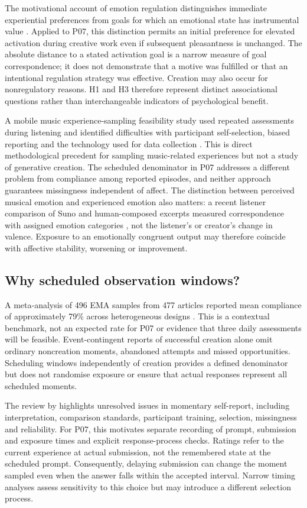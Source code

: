 \documentclass[11pt]{article}
\begin{document}
The motivational account of emotion regulation distinguishes immediate experiential preferences from goals for which an emotional state has instrumental value \citep{tamir2016}. Applied to P07, this distinction permits an initial preference for elevated activation during creative work even if subsequent pleasantness is unchanged. The absolute distance to a stated activation goal is a narrow measure of goal correspondence; it does not demonstrate that a motive was fulfilled or that an intentional regulation strategy was effective. Creation may also occur for nonregulatory reasons. H1 and H3 therefore represent distinct associational questions rather than interchangeable indicators of psychological benefit.

A mobile music experience-sampling feasibility study used repeated assessments during listening and identified difficulties with participant self-selection, biased reporting and the technology used for data collection \citep{mcferran2025}. This is direct methodological precedent for sampling music-related experiences but not a study of generative creation. The scheduled denominator in P07 addresses a different problem from compliance among reported episodes, and neither approach guarantees missingness independent of affect. The distinction between perceived musical emotion and experienced emotion also matters: a recent listener comparison of Suno and human-composed excerpts measured correspondence with assigned emotion categories \citep{qi2026}, not the listener's or creator's change in valence. Exposure to an emotionally congruent output may therefore coincide with affective stability, worsening or improvement.

\subsection{Why scheduled observation windows?}
A meta-analysis of 496 EMA samples from 477 articles reported mean compliance of approximately 79\% across heterogeneous designs \citep{wrzus2023}. This is a contextual benchmark, not an expected rate for P07 or evidence that three daily assessments will be feasible. Event-contingent reports of successful creation alone omit ordinary noncreation moments, abandoned attempts and missed opportunities. Scheduling windows independently of creation provides a defined denominator but does not randomise exposure or ensure that actual responses represent all scheduled moments.

The review by \citet{stone2023} highlights unresolved issues in momentary self-report, including interpretation, comparison standards, participant training, selection, missingness and reliability. For P07, this motivates separate recording of prompt, submission and exposure times and explicit response-process checks. Ratings refer to the current experience at actual submission, not the remembered state at the scheduled prompt. Consequently, delaying submission can change the moment sampled even when the answer falls within the accepted interval. Narrow timing analyses assess sensitivity to this choice but may introduce a different selection process.
\end{document}
